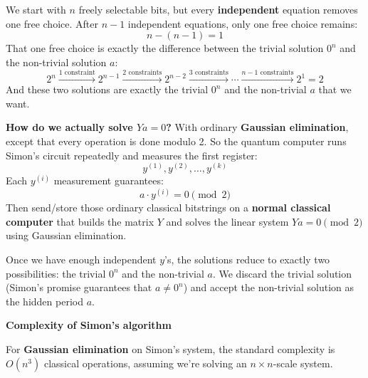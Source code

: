 \highspace
We start with $n$ freely selectable bits, but every \textbf{independent} equation removes one free choice. After $n-1$ independent equations, only one free choice remains:
\begin{equation*}
    n - (n-1) = 1
\end{equation*}
That one free choice is exactly the difference between the trivial solution $0^{n}$ and the non-trivial solution $a$:
\begin{equation*}
    2^{n} \xrightarrow{\text{1 constraint}} 2^{n-1} \xrightarrow{\text{2 constraints}} 2^{n-2} \xrightarrow{\text{3 constraints}} \cdots \xrightarrow{\text{$n-1$ constraints}} 2^{1} = 2
\end{equation*}
And these two solutions are exactly the trivial $0^{n}$ and the non-trivial $a$ that we want.

\highspace
\textcolor{Green3}{ \textbf{How do we actually solve $Ya = 0$?}} With ordinary \textbf{Gaussian elimination}, except that every operation is done modulo 2. So the quantum computer runs Simon's circuit repeatedly and measures the first register:
\begin{equation*}
    y^{(1)}, y^{(2)}, \dots, y^{(k)}
\end{equation*}
Each $y^{(i)}$ measurement guarantees:
\begin{equation*}
    a \cdot y^{(i)} = 0 \pmod 2
\end{equation*}
Then send/store those ordinary classical bitstrings on a \textbf{normal classical computer} that builds the matrix $Y$ and solves the linear system $Ya = 0 \pmod 2$ using Gaussian elimination.

\highspace
Once we have enough independent $y$'s, the solutions reduce to exactly two possibilities: the trivial $0^{n}$ and the non-trivial $a$. We discard the trivial solution (Simon's promise guarantees that $a \neq 0^{n}$) and accept the non-trivial solution as the hidden period $a$.

\highspace
\begin{flushleft}
    \textcolor{Green3}{ \textbf{Complexity of Simon's algorithm}}
\end{flushleft}
For \textbf{Gaussian elimination} on Simon's system, the standard complexity is $O(n^3)$ classical operations, assuming we're solving an $n \times n$-scale system.

